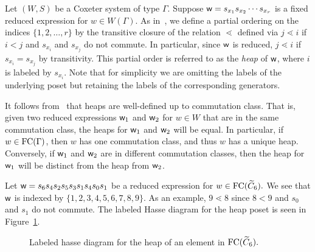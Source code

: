 Let $(W,S)$ be a Coxeter system of type $\Gamma$. Suppose $\mathsf{w}=s_{x_1}s_{x_2}\cdots s_{x_r}$ is a fixed reduced expression for $w \in W(\Gamma)$. As in~\cite{Stembridge1996}, we define a partial ordering on the indices $\{1, 2, \ldots, r\}$ by the transitive closure of the relation $\lessdot$ defined via $j \lessdot i$ if $i < j$ and $s_{x_i}$ and $s_{x_j}$ do not commute. In particular, since $\mathsf{w}$ is reduced, $j \lessdot i$ if $s_{x_i}=s_{x_j}$ by transitivity. This partial order is referred to as the \emph{heap} of $\mathsf{w}$, where $i$ is labeled by $s_{x_i}$. Note that for simplicity we are omitting the labels of the underlying poset but retaining the labels of the corresponding generators.

It follows from~\cite{Stembridge1996} that heaps are well-defined up to commutation class. That is, given two reduced expressions $\mathsf{w}_1$ and $\mathsf{w}_2$ for $w \in W$ that are in the same commutation class, the heaps for $\mathsf{w}_1$ and $\mathsf{w}_2$ will be equal. In particular, if $w \in \mathrm{FC}(\Gamma)$, then $w$ has one commutation class, and thus $w$ has a unique heap. Conversely, if $\mathsf{w}_1$ and $\mathsf{w}_2$ are in different commutation classes, then the heap for $\mathsf{w}_1$ will be distinct from the heap from $\mathsf{w}_2$.

\begin{example}\label{ex:word}
Let $\mathsf{w}=s_6s_4s_2s_5s_3s_1s_4s_0s_1$ be a reduced expression for $w \in \mathrm{FC}(\widetilde{C}_6).$ We see that $\mathsf{w}$ is indexed by $\{1,2,3,4,5,6,7,8,9\}$. As an example, $9 \lessdot 8$ since $8 <9$ and $s_0$ and $s_1$ do not commute. The labeled Hasse diagram for the heap poset is seen in Figure~\ref{fig:Hasse}.
\begin{figure}[h]
\centering
{}
\caption{Labeled hasse diagram for the heap of an element in $\mathrm{FC}(\widetilde{C}_6).$}
\label{fig:Hasse}	
\end{figure}
\end{example}

